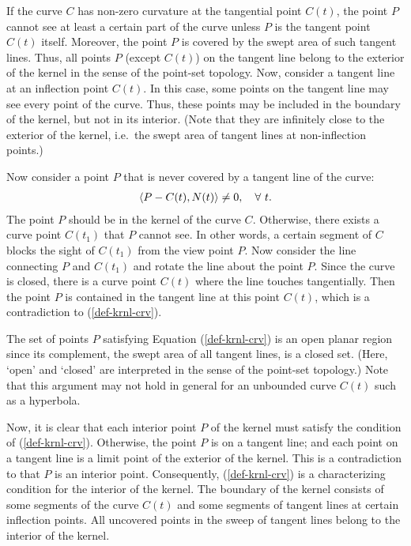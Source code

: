 \documentclass{elsart}
\begin{document}
If the curve $C$ has non-zero curvature at the tangential point $C(t)$,
the point $P$ cannot see at least a certain part of the curve
unless $P$ is the tangent point $C(t)$ itself.
%
%
Moreover, the point $P$ is covered by the swept area of such tangent lines.
Thus, all points $P$ (except $C(t)$) on the tangent line belong to
the exterior of the kernel in the sense of the point-set topology.
Now, consider a tangent line at an inflection point $C(t)$.
In this case, some points on the tangent line may see
every point of the curve.  Thus, these points may be included
in the boundary of the kernel, but not in its interior.
(Note that they are infinitely close to the exterior of the kernel,
i.e.~the swept area of tangent lines at non-inflection points.)

Now consider a point $P$ that is never covered by a tangent line
of the curve:
\begin{eqnarray}
\left<{P - C(t)}, {N(t)} \right> \neq 0,\quad \forall\ t.
\label{def-krnl-crv}
\end{eqnarray}
The point $P$ should be in the kernel of the curve $C$.
Otherwise, there exists a curve point $C(t_1)$ that $P$ cannot see.
In other words, a certain segment of $C$ blocks the sight of $C(t_1)$
from the view point $P$.  Now consider the line connecting $P$ and
$C(t_1)$ and rotate the line about the point $P$.  Since the curve
is closed, there is a curve point $C(t)$ where the line touches
tangentially.  Then the point $P$ is contained in the tangent line
at this point $C(t)$, which is a contradiction to (\ref{def-krnl-crv}).

The set of points $P$ satisfying Equation (\ref{def-krnl-crv}) is
an open planar region since its complement, the swept area of
all tangent lines, is a closed set.  (Here, `open' and `closed'
are interpreted in the sense of the point-set topology.)
Note that this argument may not hold in general
for an unbounded curve $C(t)$ such as a hyperbola.

Now, it is clear that each interior point $P$ of the kernel 
must satisfy the condition of (\ref{def-krnl-crv}).
Otherwise, the point $P$ is on a tangent line; 
%
%
and each point on a tangent line is a limit point of the exterior of the kernel.
This is a contradiction to that $P$ is an interior point.
Consequently, (\ref{def-krnl-crv}) is a characterizing condition
for the interior of the kernel.  The boundary of the kernel
consists of some segments of the curve $C(t)$ and some segments
of tangent lines at certain inflection points.  All uncovered points
in the sweep of tangent lines belong to the interior of the kernel.
 
\end{document}
